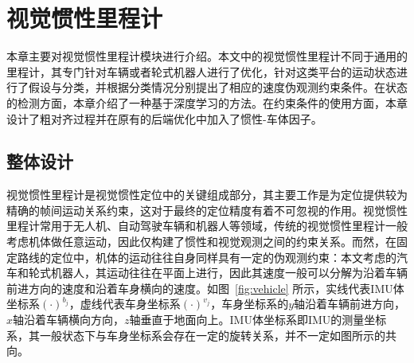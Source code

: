 
\chapter{视觉惯性里程计}

本章主要对视觉惯性里程计模块进行介绍。本文中的视觉惯性里程计不同于通用的里程计，其专门针对车辆或者轮式机器人进行了优化，针对这类平台的运动状态进行了假设与分类，并根据分类情况分别提出了相应的速度伪观测约束条件。在状态的检测方面，本章介绍了一种基于深度学习的方法。在约束条件的使用方面，本章设计了粗对齐过程并在原有的后端优化中加入了惯性-车体因子。

\section{整体设计}
视觉惯性里程计是视觉惯性定位中的关键组成部分，其主要工作是为定位提供较为精确的帧间运动关系约束，这对于最终的定位精度有着不可忽视的作用。视觉惯性里程计常用于无人机、自动驾驶车辆和机器人等领域，传统的视觉惯性里程计一般考虑机体做任意运动，因此仅构建了惯性和视觉观测之间的约束关系。而然，在固定路线的定位中，机体的运动往往自身同样具有一定的伪观测约束：本文考虑的汽车和轮式机器人，其运动往往在平面上进行，因此其速度一般可以分解为沿着车辆前进方向的速度和沿着车身横向的速度。如图~\ref{fig:vehicle} 所示，实线代表IMU体坐标系$(\cdot)^{b_{j}}$，虚线代表车身坐标系$(\cdot)^{v_{j}}$，车身坐标系的$y$轴沿着车辆前进方向，$x$轴沿着车辆横向方向，$z$轴垂直于地面向上。IMU体坐标系即IMU的测量坐标系，其一般状态下与车身坐标系会存在一定的旋转关系，并不一定如图所示的共向。

